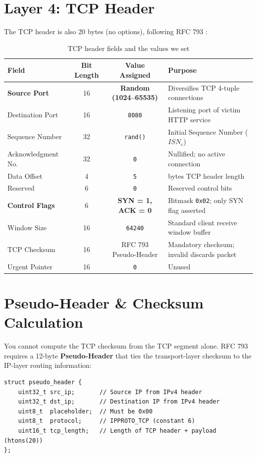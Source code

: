 \documentclass[11pt,a4paper]{report}
\begin{document}
\section{Layer 4: TCP Header}
The TCP header is also 20 bytes (no options), following RFC 793 \cite{rfc793}:
\begin{table}[H]
    \centering
    \small
    \renewcommand{\arraystretch}{0.88}
    \caption{TCP header fields and the values we set}
    \label{tab:tcp_fields}
    \begin{tabularx}{\textwidth}{@{}l c c >{\raggedright\arraybackslash}X@{}}
        \toprule
        \textbf{Field} & \textbf{Bit Length} & \textbf{Value Assigned} & \textbf{Purpose} \\
        \midrule
        \textbf{Source Port} & 16 & \textbf{Random (1024--65535)} & Diversifies TCP 4-tuple connections \\
        Destination Port & 16 & \texttt{8080} & Listening port of victim HTTP service \\
        Sequence Number & 32 & \texttt{rand()} & Initial Sequence Number ($ISN_c$) \\
        Acknowledgment No. & 32 & \texttt{0} & Nullified; no active connection \\
        Data Offset & 4 & \texttt{5} & 20 bytes TCP header length \\
        Reserved & 6 & \texttt{0} & Reserved control bits \\
        \textbf{Control Flags} & 6 & \textbf{SYN = 1, ACK = 0} & Bitmask \texttt{0x02}; only SYN flag asserted \\
        Window Size & 16 & \texttt{64240} & Standard client receive window buffer \\
        TCP Checksum & 16 & RFC 793 Pseudo-Header & Mandatory checksum; invalid discards packet \\
        Urgent Pointer & 16 & \texttt{0} & Unused \\
        \bottomrule
    \end{tabularx}
\end{table}

\section{Pseudo-Header \& Checksum Calculation}
You cannot compute the TCP checksum from the TCP segment alone. RFC 793 \cite{rfc793} requires a 12-byte \textbf{Pseudo-Header} that ties the transport-layer checksum to the IP-layer routing information:
\begin{lstlisting}[style=customc]
struct pseudo_header {
    uint32_t src_ip;       // Source IP from IPv4 header
    uint32_t dst_ip;       // Destination IP from IPv4 header
    uint8_t  placeholder;  // Must be 0x00
    uint8_t  protocol;     // IPPROTO_TCP (constant 6)
    uint16_t tcp_length;   // Length of TCP header + payload (htons(20))
};
\end{lstlisting}
\end{document}
